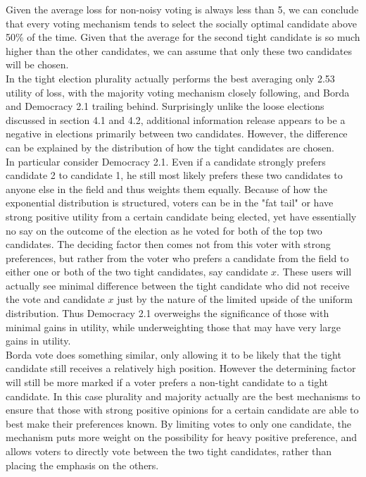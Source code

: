 \documentclass[11pt]{scrartcl}
\begin{document}
Given the average loss for non-noisy voting is always less than 5, we can conclude that every voting mechanism tends to select the socially optimal candidate above 50\% of the time. Given that the average for the second tight candidate is so much higher than the other candidates, we can assume that only these two candidates will be chosen.\\

In the tight election plurality actually performs the best averaging only 2.53 utility of loss, with the majority voting mechanism closely following, and Borda and Democracy 2.1 trailing behind. Surprisingly unlike the loose elections discussed in section 4.1 and 4.2, additional information release appears to be a negative in elections primarily between two candidates. However, the difference can be explained by the distribution of how the tight candidates are chosen.\\

In particular consider Democracy 2.1. Even if a candidate strongly prefers candidate 2 to candidate 1, he still most likely prefers these two candidates to anyone else in the field and thus weights them equally.  Because of how the exponential distribution is structured, voters can be in the "fat tail" or have strong positive utility from a certain candidate being elected, yet have essentially no say on the outcome of the election as he voted for both of the top two candidates. The deciding factor then comes not from this voter with strong preferences, but rather from the voter who prefers a candidate from the field to either one or both of the two tight candidates, say candidate $x$. These users will actually see minimal difference between the tight candidate who did not receive the vote and candidate $x$ just by the nature of the limited upside of the uniform distribution. Thus Democracy 2.1 overweighs the significance of those with minimal gains in utility, while underweighting those that may have very large gains in utility.\\

Borda vote does something similar, only allowing it to be likely that the tight candidate still receives a relatively high position. However the determining factor will still be more marked if a voter prefers a non-tight candidate to a tight candidate. In this case plurality and majority actually are the best mechanisms to ensure that those with strong positive opinions for a certain candidate are able to best make their preferences known. By limiting votes to only one candidate, the mechanism puts more weight on the possibility for heavy positive preference, and allows voters to directly vote between the two tight candidates, rather than placing the emphasis on the others.
\end{document}
